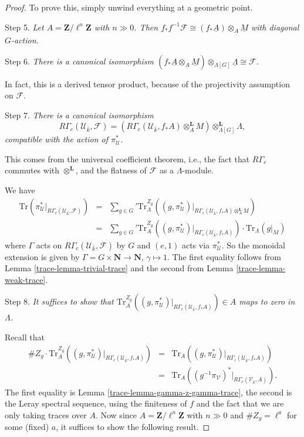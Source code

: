 \begin{proof}
\medskip\noindent
To prove this, simply unwind everything at a geometric point.

\medskip\noindent
Step 5. {\it Let $A = \mathbf{Z}/\ell^n \mathbf{Z}$ with $n\gg 0$. Then
$f_*f^{-1}\mathcal{F} \cong (f_*\underline A)
\otimes_{\underline A} \underline M$ with diagonal $G$-action.}

\medskip\noindent
Step 6. {\it There is a canonical isomorphism
$(f_*\underline A \otimes_{\underline A} \underline M)
\otimes_{\Lambda[G]} \underline \Lambda \cong \mathcal{F}$.
}

\medskip\noindent
In fact, this is a derived tensor product, because of the projectivity
assumption on $\mathcal{F}$.

\medskip\noindent
Step 7. {\it There is a canonical isomorphism
$$
R\Gamma_c(\mathcal{U}_{\bar k}, \mathcal{F})
= (R\Gamma_c(\mathcal{U}_{\bar k}, f_*A)\otimes_A^\mathbf{L}
M)\otimes_{\Lambda[G]}^\mathbf{L} \Lambda,
$$
compatible with the action of $\pi^*_\mathcal{U}$.
}

\medskip\noindent
This comes from the universal coefficient theorem, i.e., the fact that
$R\Gamma_c$ commutes with $\otimes^\mathbf{L}$, and the flatness of
$\mathcal{F}$ as a $\Lambda$-module.

\medskip\noindent
We have
\begin{eqnarray*}
\text{Tr}(
\pi_\mathcal{U}^* |_{R\Gamma_c(\mathcal{U}_{\bar k}, \mathcal{F})})
& = &
{\sum_{g \in G}}'
\text{Tr}_{\Lambda}^{Z_g}
\left(
(g, \pi_\mathcal{U}^*)
|_{R\Gamma_c(\mathcal{U}_{\bar k}, f_*A)\otimes_A^\mathbf{L} M}
\right) \\
& = &
{\sum_{g\in G}}'
\text{Tr}_A^{Z_g}
(
(g, \pi_\mathcal{U}^*) |_{R\Gamma_c(\mathcal{U}_{\bar k}, f_*A)}
)
\cdot
\text{Tr}_\Lambda(g|_M)
\end{eqnarray*}
where $\Gamma$ acts on $R\Gamma_c(\mathcal{U}_{\bar k}, \mathcal{F})$ by $G$
and $(e, 1)$ acts via $\pi_\mathcal{U}^*$. So the monoidal extension is given
by $\Gamma = G \times \mathbf{N} \to \mathbf{N}$, $\gamma \mapsto 1$. The first
equality follows from Lemma \ref{trace-lemma-trivial-trace} and the second from
Lemma \ref{trace-lemma-weak-trace}.

\medskip\noindent
Step 8. {\it It suffices to show that
$\text{Tr}_A^{Z_g}((g, \pi_\mathcal{U}^*)
|_{R\Gamma_c(\mathcal{U}_{\bar k}, f_*A)}) \in A$
maps to zero in $\Lambda$.
}

\medskip\noindent
Recall that
\begin{eqnarray*}
\# Z_g \cdot \text{Tr}_A^{Z_g}((g, \pi_\mathcal{U}^*)
|_{R\Gamma_c(\mathcal{U}_{\bar k}, f_*A)})
& = & \text{Tr}_A((g, \pi_\mathcal{U}^*)
|_{R\Gamma_c(\mathcal{U}_{\bar k}, f_*A)})\\
& = &
\text{Tr}_A((g^{-1}\pi_\mathcal{V})^* |_{R\Gamma_c(\mathcal{V}_{\bar k}, A)}).
\end{eqnarray*}
The first equality is
Lemma \ref{trace-lemma-gamma-z-gamma-trace},
the second is the Leray
spectral sequence, using the finiteness of $f$ and the fact that we are only
taking traces over $A$. Now since $A=\mathbf{Z}/\ell^n\mathbf{Z}$ with
$n \gg 0$ and $\# Z_g = \ell^a$ for some (fixed) $a$,
it suffices to show the following result.


\end{proof}

